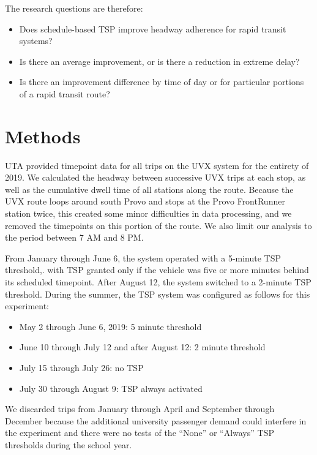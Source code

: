 \documentclass[3p, authoryear, review]{elsarticle} %
\providecommand{\tightlist}{%
  \setlength{\itemsep}{0pt}\setlength{\parskip}{0pt}}
\begin{document}
The research questions are therefore:

\begin{itemize}
\tightlist
\item
  Does schedule-based TSP improve headway adherence for rapid transit systems?
\item
  Is there an average improvement, or is there a reduction in extreme delay?
\item
  Is there an improvement difference by time of day or for particular portions
  of a rapid transit route?
\end{itemize}

\hypertarget{methods}{%
\section{Methods}\label{methods}}

UTA provided timepoint data for all trips on the UVX system for the entirety of
2019. We calculated the headway between successive UVX trips at each stop, as
well as the cumulative dwell time of all stations along the route. Because the
UVX route loops around south Provo and stops at the Provo FrontRunner station
twice, this created some minor difficulties in data processing, and we removed
the timepoints on this portion of the route. We also limit our analysis to the
period between 7 AM and 8 PM.

From January through June 6, the system operated with a 5-minute TSP threshold,.
with TSP granted only if the vehicle was five or more minutes behind its
scheduled timepoint. After August 12, the system switched to a 2-minute TSP
threshold. During the summer, the TSP system was configured as follows for this
experiment:

\begin{itemize}
\tightlist
\item
  May 2 through June 6, 2019: 5 minute threshold
\item
  June 10 through July 12 and after August 12: 2 minute threshold
\item
  July 15 through July 26: no TSP
\item
  July 30 through August 9: TSP always activated
\end{itemize}

We discarded trips from January through April and September through December
because the additional university passenger demand could interfere in the
experiment and there were no tests of the ``None'' or ``Always'' TSP thresholds
during the school year.
\end{document}
